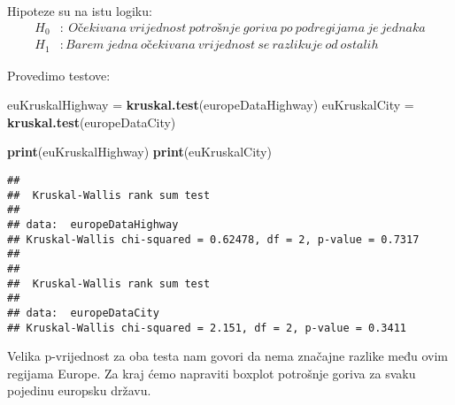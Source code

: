 \documentclass[
]{article}
\newenvironment{Shaded}{\begin{snugshade}}{\end{snugshade}}
\newcommand{\AttributeTok}[1]{\textcolor[rgb]{0.13,0.29,0.53}{#1}}
\newcommand{\FloatTok}[1]{\textcolor[rgb]{0.00,0.00,0.81}{#1}}
\newcommand{\FunctionTok}[1]{\textcolor[rgb]{0.13,0.29,0.53}{\textbf{#1}}}
\newcommand{\NormalTok}[1]{#1}
\newcommand{\OtherTok}[1]{\textcolor[rgb]{0.56,0.35,0.01}{#1}}
\newcommand{\SpecialCharTok}[1]{\textcolor[rgb]{0.81,0.36,0.00}{\textbf{#1}}}
\newcommand{\StringTok}[1]{\textcolor[rgb]{0.31,0.60,0.02}{#1}}
\begin{document}
Hipoteze su na istu logiku: \[\begin{aligned}
H_0 &:\ Očekivana\ vrijednost\ potrošnje\ goriva\ po\ podregijama\ je\ jednaka\\
H_1 & :Barem\ jedna\ očekivana\ vrijednost\ se\ razlikuje\ od\ ostalih
\end{aligned}\]

Provedimo testove:

\begin{Shaded}
\begin{Highlighting}[]
\NormalTok{euKruskalHighway }\OtherTok{=} \FunctionTok{kruskal.test}\NormalTok{(europeDataHighway)}
\NormalTok{euKruskalCity }\OtherTok{=} \FunctionTok{kruskal.test}\NormalTok{(europeDataCity)}

\FunctionTok{print}\NormalTok{(euKruskalHighway)}
\FunctionTok{print}\NormalTok{(euKruskalCity)}
\end{Highlighting}
\end{Shaded}

\begin{verbatim}
## 
##  Kruskal-Wallis rank sum test
## 
## data:  europeDataHighway
## Kruskal-Wallis chi-squared = 0.62478, df = 2, p-value = 0.7317
## 
## 
##  Kruskal-Wallis rank sum test
## 
## data:  europeDataCity
## Kruskal-Wallis chi-squared = 2.151, df = 2, p-value = 0.3411
\end{verbatim}

Velika p-vrijednost za oba testa nam govori da nema značajne razlike
među ovim regijama Europe. Za kraj ćemo napraviti boxplot potrošnje
goriva za svaku pojedinu europsku državu.

\begin{Shaded}
\end{Shaded}
\end{document}

